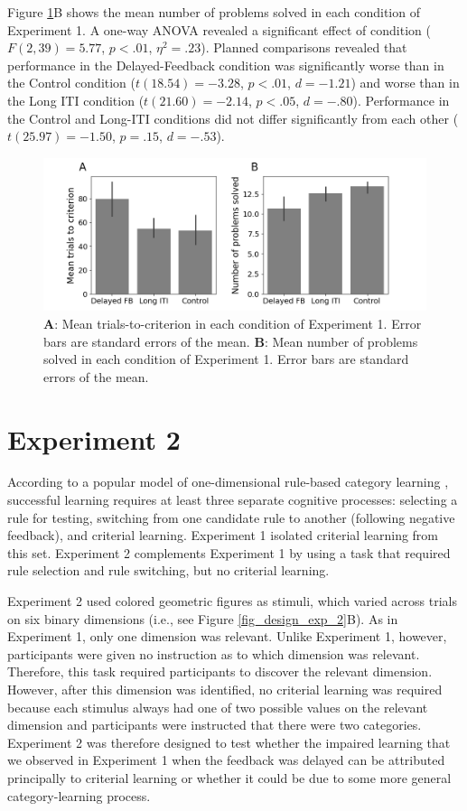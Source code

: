 \documentclass[doc, floatsintext]{apa7}
\begin{document}
Figure \ref{fig_exp_1_t2c}B shows the mean number of
problems solved in each condition of Experiment 1. A one-way
ANOVA revealed a significant effect of condition ($F(2, 39)
= 5.77$, $p < .01$, $\eta^2 = .23$). Planned comparisons
revealed that performance in the Delayed-Feedback condition
was significantly worse than in the Control condition
($t(18.54) = -3.28$, $p < .01$, $d=-1.21$) and worse than in
the Long ITI condition ($t(21.60) = -2.14$, $p < .05$,
$d=-.80$).  Performance in the Control and Long-ITI
conditions did not differ significantly from each other
($t(25.97) = -1.50$, $p=.15$, $d=-.53$).

\begin{figure}
  \centering
  \includegraphics[width=.8\textwidth]{../figures/fig_exp_1_t2c.png}
    \caption{
        \textbf{A}: Mean trials-to-criterion in each
        condition of Experiment 1. Error bars are standard
        errors of the mean.
        \textbf{B}: Mean number of problems solved in each
        condition of Experiment 1. Error bars are standard
        errors of the mean.
}
  \label{fig_exp_1_t2c}
\end{figure}

\section{Experiment 2}
According to a popular model of one-dimensional rule-based
category learning \parencite[i.e.,
COVIS;][]{AshbyCOVIS1998}, successful learning requires at
least three separate cognitive processes: selecting a rule
for testing, switching from one candidate rule to another
(following negative feedback), and criterial learning.
Experiment 1 isolated criterial learning from this set.
Experiment 2 complements Experiment 1 by using a task that
required rule selection and rule switching, but no criterial
learning. 

Experiment 2 used colored geometric figures as stimuli,
which varied across trials on six binary dimensions (i.e.,
see Figure \ref{fig_design_exp_2}B). As in Experiment 1,
only one dimension was relevant. Unlike Experiment 1,
however, participants were given no instruction as to which
dimension was relevant. Therefore, this task required
participants to discover the relevant dimension. However,
after this dimension was identified, no criterial learning
was required because each stimulus always had one of two
possible values on the relevant dimension and participants
were instructed that there were two categories. Experiment 2
was therefore designed to test whether the impaired learning
that we observed in Experiment 1 when the feedback was
delayed can be attributed principally to criterial learning
or whether it could be due to some more general
category-learning process.
\end{document}
